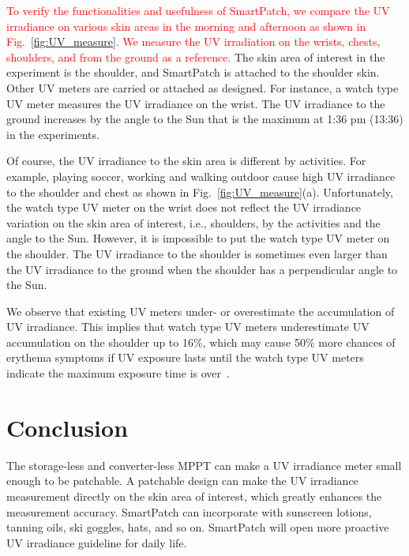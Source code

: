 \documentclass[journal]{IEEEtran}
\begin{document}
\textcolor{red}{To verify the functionalities and usefulness of SmartPatch, we compare the UV irradiance on various skin areas in the morning and afternoon as shown in Fig.~\ref{fig:UV_measure}. We measure the UV irradiation on the wrists, chests, shoulders, and from the ground as a reference.}
The skin area of interest in the experiment is the shoulder, and SmartPatch is attached to the shoulder skin. Other UV meters are carried or attached as designed. For instance, a watch type UV meter measures the UV irradiance on the wrist. The UV irradiance to the ground increases by the angle to the Sun that is the maximum at 1:36 pm (13:36) in the experiments.

Of course, the UV irradiance to the skin area is different by activities.
For example, playing soccer, working and walking outdoor cause high UV irradiance to the shoulder and chest as shown in Fig.~\ref{fig:UV_measure}(a).
Unfortunately, the watch type UV meter on the wrist does not reflect the UV irradiance variation on the skin area of interest, i.e., shoulders, by the activities and the angle to the Sun.
However, it is impossible to put the watch type UV meter on the shoulder.
The UV irradiance to the shoulder is sometimes even larger than the UV irradiance to the ground when the shoulder has a perpendicular angle to the Sun.

We observe that existing UV meters under- or overestimate the accumulation of UV irradiance.
This implies that watch type UV meters underestimate UV accumulation on the shoulder up to 16\%, which may cause 50\% more chances of erythema symptoms if UV exposure lasts until the watch type UV meters indicate the maximum exposure time is over~\cite{Harrison:Method02}.

\section{Conclusion}

The storage-less and converter-less MPPT can make a UV irradiance meter small enough to be patchable.
A patchable design can make the UV irradiance measurement directly on the skin area of interest, which greatly enhances the measurement accuracy.
SmartPatch can incorporate with sunscreen lotions, tanning oils, ski goggles, hats, and so on.
SmartPatch will open more proactive UV irradiance guideline for daily life.
\end{document}
